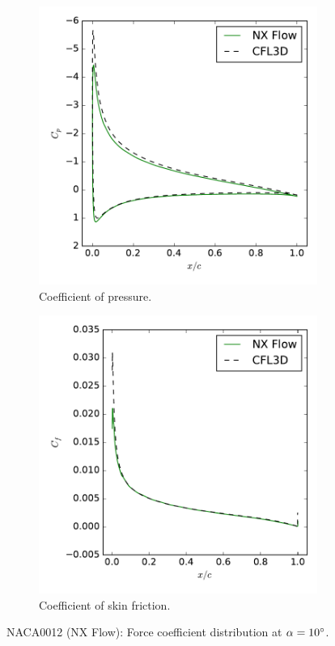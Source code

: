 \begin{figure}[ht!]
\centering
\begin{subfigure}{.45\textwidth}
  \centering
  \includegraphics[width=1.0\textwidth]{figs/naca0012/cp_10.pdf}
  \caption{Coefficient of pressure.}
\end{subfigure}%
\begin{subfigure}{.45\textwidth}
  \centering
  \includegraphics[width=1.0\textwidth]{figs/naca0012/cf_10.pdf}
  \caption{Coefficient of skin friction.}
\end{subfigure}
\caption{NACA0012 (NX Flow): Force coefficient distribution at $\alpha = 10^\circ$.}
\label{fig:naca0012_10}
\end{figure}


